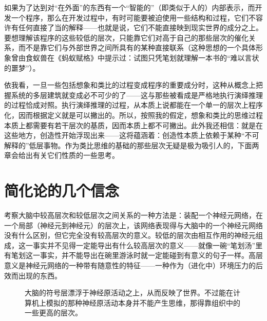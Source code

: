 如果为了达到对“在外面”的东西有一个“智能的”（即类似于人的）内部表示，而开发一个程序，那么在开发过程中，有时可能要被迫使用一些结构和过程，它们不容许有任何直接了当的解释——也就是说，它们不能直接映到现实世界的成分之上。要想理解该程序的这些较低的层次，只能靠它们对高于自己的那些层次的催化关系，而不是靠它们与外部世界之间所具有的某种直接联系（这种思想的一个具体形象曾由食蚁兽在《蚂蚁赋格》中提示过：试图只凭笔划就理解一本书的“难以言状的噩梦”）。

依我看，一旦一些包括想象和类比的过程变成程序的重要成分时，这种从概念上把握系统的多层建筑就变成必不可少的了——这与那些被看成是严格地执行演绎推理的过程恰成对照。执行演绎推理的过程，从本质上说都能在一个单一的层次上程序化，因而根据定义就是可以撇出的。所以，按照我的假定，想象和类比的思维过程本质上都需要有若干层次的基质，因而本质上都不可撇出。此外我还相信：就是在这些地方，创造性开始浮现出来——这将蕴涵着：创造性本质上依赖于某种“不可解释的”低层事物。作为类比思维的基础的那些层次无疑是极为吸引人的，下面两章会给出有关它们性质的一些思考。

\section{简化论的几个信念}

考察大脑中较高层次和较低层次之间关系的一种方法是：装配一个神经元网络，在一个局部（神经元到神经元）的层次上，该网络表现得与大脑中的一个神经元网络没有什么区别，但它完全没有较高层次的意义。较低的层次由相互作用的神经元组成，这一事实并不见得一定能导出有什么较高层次的意义——就像一碗“笔划汤”里有笔划这一事实，并不能导出在碗里游泳时就一定能碰到有意义的句子一样。高层意义是神经元网络的一种带有随意性的特征——一种作为（进化中）环境压力的后效而出现的东西。

\begin{figure}
\caption[大脑中的神经和符号活动。]
  {大脑的符号层漂浮于神经原活动之上，从而反映了世界。不过能在计算机上模拟的那种神经原活动本身并不能产生思维，那得靠组织中的一些更高的层次。}
\end{figure}

